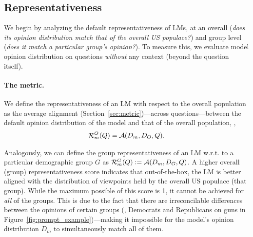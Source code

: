 \subsection{Representativeness}
\label{sec:rep}

We begin by analyzing the default representativeness of LMs,  at an overall (\emph{does its opinion distribution match that of the overall US populace?}) and group level (\emph{does it match a particular group's opinion?}).
To measure this, we evaluate model opinion distribution on \bname questions \emph{without} any context (beyond the question itself).

\paragraph{The metric.} We define the representativeness of an LM with respect to the overall population as the average alignment (Section~\ref{sec:metric})---across questions---between the default opinion distribution of the model and that of the overall population, \ie, 
\begin{equation}
    \mathcal{R}^{O}_m(Q) = \mathcal{A}(D_m, D_O, Q).
  \end{equation}

Analogously, we can define the group representativeness of an LM w.r.t. to a particular demographic group $G$ as $\mathcal{R}^G_m(Q) := \mathcal{A}(D_m, D_G, Q)$.
A higher overall (group) representativeness score indicates that out-of-the-box, the LM is better aligned with the distribution of viewpoints held by the overall US populace (that group).
While the maximum possible of this score is 1, it cannot be achieved for \emph{all} of the groups.
This is due to the fact that there are irreconcilable differences between the opinions of certain groups (\eg, Democrats and Republicans on guns in Figure~\ref{fig:prompt_example})---making it impossible for the model's opinion distribution $D_m$ to simultaneously match all of them.



